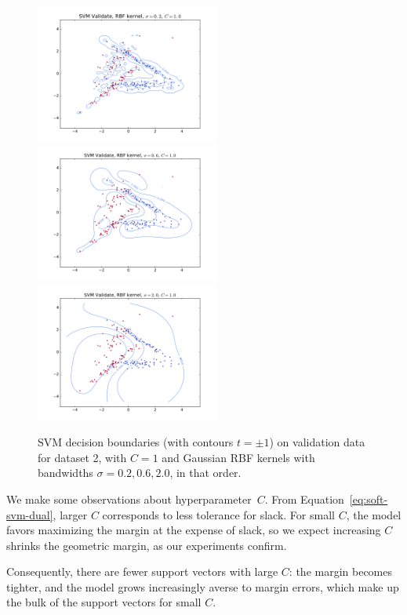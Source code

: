 \documentclass{article}
\begin{document}
\begin{multicols}{2}
\begin{figure}[t]
   \centering
   \includegraphics[width=2.4in]{img/p2-3-d2-c1-rbf02/validate.pdf}
   \includegraphics[width=2.4in]{img/p2-3-d2-c1-rbf06/validate.pdf}
   \includegraphics[width=2.4in]{img/p2-3-d2-c1-rbf20/validate.pdf}
   \caption{SVM decision boundaries (with contours $t = \pm1$) on validation data for dataset 2, with $C = 1$ and Gaussian RBF kernels with bandwidths $\sigma=0.2,0.6,2.0$, in that order.}
   \label{fig:2-3-gaussian-rbf}
\end{figure}

We make some observations about hyperparameter~$C$.
From Equation~\ref{eq:soft-svm-dual},
larger $C$ corresponds to less tolerance for slack.
For small $C$, the model favors
maximizing the margin at the expense of slack,
so we expect increasing $C$ shrinks the geometric margin,
as our experiments confirm.

Consequently, there are fewer support vectors with large $C$:
the margin becomes tighter,
and the model grows increasingly averse to margin errors,
which make up the bulk of the support vectors for small $C$.


\end{multicols}
\end{document}
